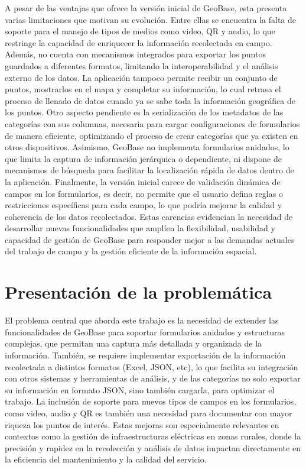 \documentclass[12pt, a4paper]{book}
\begin{document}
A pesar de las ventajas que ofrece la versión inicial de GeoBase, esta presenta varias limitaciones que motivan su evolución. Entre ellas se encuentra la falta de soporte para el manejo de tipos de medios como video, QR y audio, lo que restringe la capacidad de enriquecer la información recolectada en campo. Además, no cuenta con mecanismos integrados para exportar los puntos guardados a diferentes formatos, limitando la interoperabilidad y el análisis externo de los datos. La aplicación tampoco permite recibir un conjunto de puntos, mostrarlos en el mapa y completar su información, lo cual retrasa el proceso de llenado de datos cuando ya se sabe toda la información geográfica de los puntos. Otro aspecto pendiente es la serialización de los metadatos de las categorías con sus columnas, necesaria para cargar configuraciones de formularios de manera eficiente, optimizando el proceso de crear categorías que ya existen en otros dispositivos. Asimismo, GeoBase no implementa formularios anidados, lo que limita la captura de información jerárquica o dependiente, ni dispone de mecanismos de búsqueda para facilitar la localización rápida de datos dentro de la aplicación. Finalmente, la versión inicial carece de validación dinámica de campos en los formularios, es decir, no permite que el usuario defina reglas o restricciones específicas para cada campo, lo que podría mejorar la calidad y coherencia de los datos recolectados. Estas carencias evidencian la necesidad de desarrollar nuevas funcionalidades que amplíen la flexibilidad, usabilidad y capacidad de gestión de GeoBase para responder mejor a las demandas actuales del trabajo de campo y la gestión eficiente de la información espacial.

\section{Presentación de la
problemática}\label{presentaciuxf3n-de-la-problemuxe1tica}

El problema central que aborda este trabajo es la necesidad de extender las funcionalidades de GeoBase para soportar formularios anidados y estructuras complejas, que permitan una captura más detallada y organizada de la información. También, se requiere implementar exportación de la información recolectada a distintos formatos (Excel, JSON, etc), lo que facilita su integración con otros sistemas y herramientas de análisis, y de las categorías no solo exportar su información en formato JSON, sino también cargarla, para optimizar el trabajo. La inclusión de soporte para nuevos tipos de campos en los formularios, como video, audio y QR es también una necesidad para documentar con mayor riqueza los puntos de interés. Estas mejoras son especialmente relevantes en contextos como la gestión de infraestructuras eléctricas en zonas rurales, donde la precisión y rapidez en la recolección y análisis de datos impactan directamente en la eficiencia del mantenimiento y la calidad del servicio.
\end{document}
